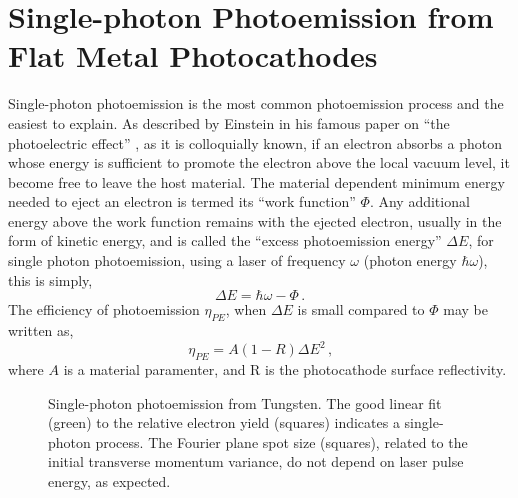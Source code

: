 
\section{Single-photon Photoemission from Flat Metal Photocathodes} \label{sec:single_photon}

Single-photon photoemission is the most common photoemission process and the easiest to explain.
As described by Einstein in his famous paper on ``the photoelectric effect'' \cite{einstein_uber_1905}, as it is colloquially known, if an electron absorbs a photon whose energy is sufficient to promote the electron above the local vacuum level, it become free to leave the host material.
The material dependent minimum energy needed to eject an electron is termed its ``work function'' $\Phi$.
Any additional energy above the work function remains with the ejected electron, usually in the form of kinetic energy, and is called the ``excess photoemission energy'' $\Delta E$, for single photon photoemission, using a laser of frequency $\omega$ (photon energy $\hbar \omega$), this is simply,
\begin{equation}
  \Delta E = \hbar \omega - \Phi \,\text{.}
\end{equation}
The efficiency of photoemission $\eta_{{\scriptscriptstyle PE}}$, when $\Delta E$ is small compared to $\Phi$ may be written as,
\begin{equation}
  \eta_{{\scriptscriptstyle PE}} = A ( 1 - R ) \Delta E^2 \,\text{,}
\end{equation}
where $A$ is a material paramenter, and R is the photocathode surface reflectivity.

\begin{figure}
  \centering
  
  \caption[Single-photon photoemission from Tungsten]{
    Single-photon photoemission from Tungsten.
    The good linear fit (green) to the relative electron yield (squares) indicates a single-photon process.
    The Fourier plane spot size (squares), related to the initial transverse momentum variance, do not depend on laser pulse energy, as expected.
  }
  \label{fig:single_photon_tungsten}
\end{figure}

